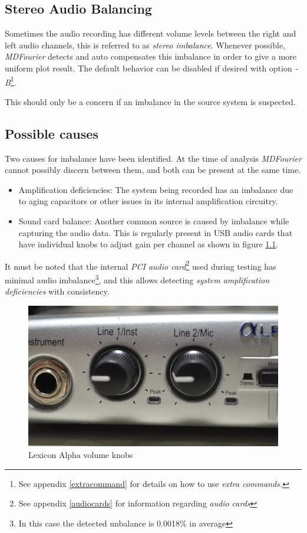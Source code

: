 \documentclass[10pt,a4paper]{report}
\begin{document}
\begin{appendices}
\chapter{Stereo Audio Balancing}
\label{stereobalancing}

Sometimes the audio recording has different volume levels between the right and left audio channels, this is referred to as \textit{stereo imbalance}. Whenever possible, \textit{MDFourier} detects and auto compensates this imbalance in order to give a more uniform plot result. The default behavior can be disabled if desired with option \textit{-B}\footnote{See appendix \ref{extracommand} for details on how to use \textit{extra commands.}}.

This should only be a concern if an imbalance in the source system is suspected. 

\section{Possible causes}

Two causes for imbalance have been identified. At the time of analysis \textit{MDFourier} cannot possibly discern between them, and both can be present at the same time. 

\begin{itemize}
	\item Amplification deficiencies: The system being recorded has an imbalance due to aging capacitors or other issues in its internal amplification circuitry.
	\item Sound card balance: Another common source is caused by imbalance while capturing the audio data. This is regularly present in USB audio cards that have individual knobs to adjust gain per channel as shown in figure \ref{fig:lexiconknobs}.
\end{itemize}

It must be noted that the internal \textit{PCI audio card}\footnote{See appendix \ref{audiocards} for information regarding \textit{audio cards}} used during testing has minimal audio imbalance\footnote{In this case the detected unbalance is  0.0018\% in average}, and this allows detecting \textit{system amplification deficiencies} with consistency.

\begin{figure}[H]
	\centering
	\includegraphics[width=0.8\linewidth]{images/imbalance/lexicon.png}
	\caption[Lexicon knobs]{Lexicon Alpha volume knobs}
	\label{fig:lexiconknobs}
\end{figure}


\end{appendices}
\end{document}
